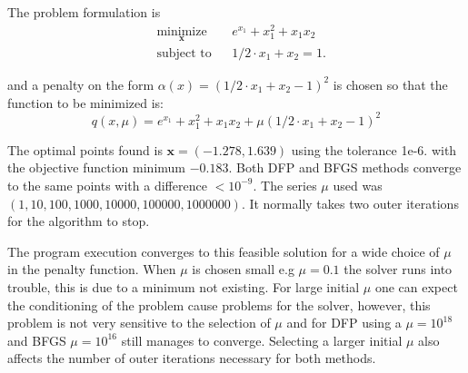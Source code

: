The problem formulation is
\begin{equation*}
\begin{aligned}
& \underset{\mathbf{x}}{\text{minimize}}
& & e^{x_1} + x_1^2 + x_1 x_2 \\
& \text{subject to}
& & 1/2 \cdot x_1 + x_2 = 1.
\end{aligned}
\end{equation*}

and a penalty on the form $\alpha(x) = (1/2 \cdot x_1 + x_2 - 1)^2$ is chosen so that the function to be minimized is:
$$
q(x,\mu) = e^{x_1} + x_1^2 + x_1 x_2 + \mu (1/2 \cdot x_1 + x_2 - 1)^2
$$

The optimal points found is $ \mathbf{x} = (-1.278, 1.639) $ using the tolerance 1e-6. with the objective function minimum $-0.183$. Both DFP and BFGS methods converge to the same points with a difference $< 10^{-9}$. The series $\mu$ used was $(1, 10, 100, 1000, 10000, 100000, 1000000)$. It normally takes two outer iterations for the algorithm to stop.

The program execution converges to this feasible solution for a wide choice of $\mu$ in the penalty function. When $\mu$ is chosen small e.g $\mu = 0.1$ the solver runs into trouble, this is due to a minimum not existing. For large initial $\mu$ one can expect the conditioning of the problem cause problems for the solver, however, this problem is not very sensitive to the selection of $\mu$ and for DFP using a $\mu = 10^18$ and BFGS $\mu = 10^16$ still manages to converge. Selecting a larger initial $\mu$ also affects the number of outer iterations necessary for both methods.